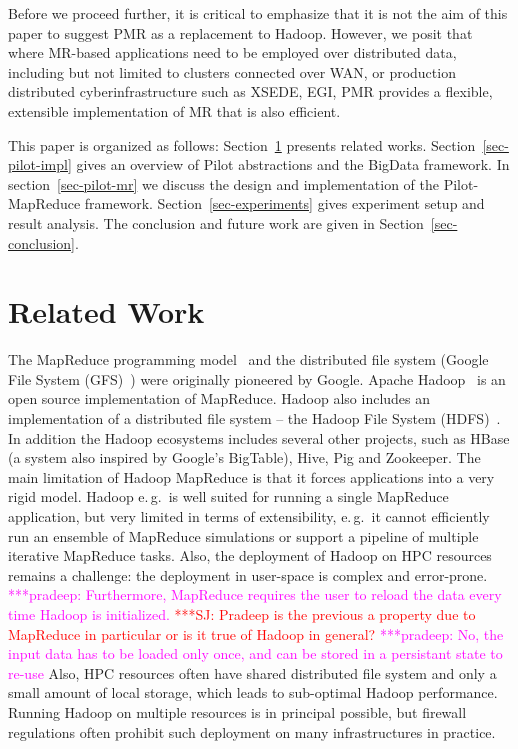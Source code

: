 \documentclass{sig-alternate}
\newcommand{\jhanote}[1]{ {\textcolor{red} { ***SJ: #1 }}}
\newcommand{\pnote}[1]{ {\textcolor{magenta} { ***pradeep: #1 }}}
\newcommand{\pnote}[1]{}
\newcommand{\jhanote}[1]{}
\newcommand{\upp}{\vspace*{-0.5em}}
\newcommand{\pilot}{Pilot\xspace}
\newcommand{\pilotmapreduce}{Pilot-MapReduce\xspace}
\begin{document}
Before we proceed further, it is critical to emphasize that it is not
the aim of this paper to suggest PMR as a replacement to Hadoop.
However, we posit that where MR-based applications need to be employed
over distributed data, including but not limited to clusters connected
over WAN, or production distributed cyberinfrastructure such as XSEDE,
EGI, PMR provides a flexible, extensible implementation of MR that is
also efficient.
 

This paper is organized as follows: Section~\ref{sec:related_work} presents
related works. Section~\ref{sec-pilot-impl} gives an overview of \pilot
abstractions and the BigData framework. In section~\ref{sec-pilot-mr} we discuss
the design and implementation of the \pilotmapreduce framework.
Section~\ref{sec-experiments} gives experiment setup and result analysis. The
conclusion and future work are given in Section~\ref{sec-conclusion}.

\upp\upp

\section{Related Work}
\label{sec:related_work}
The MapReduce programming model~\cite{Dean:2004:MSD:1251254.1251264}
and the distributed file system (Google File System
(GFS)~\cite{Ghemawat:2003:GFS:1165389.945450}) were originally
pioneered by Google. Apache Hadoop~\cite{hadoop} is an open source
implementation of MapReduce. Hadoop also includes an implementation of
a distributed file system -- the Hadoop File System
(HDFS)~\cite{Borthakur:2007fk}. In addition the Hadoop ecosystems
includes several other projects, such as HBase (a system also inspired
by Google's BigTable), Hive, Pig and Zookeeper. The main limitation of
Hadoop MapReduce is that it forces applications into a very rigid
model. Hadoop e.\,g.\ is well suited for running a single MapReduce
application, but very limited in terms of extensibility, e.\,g.\ it
cannot efficiently run an ensemble of MapReduce simulations or support
a pipeline of multiple iterative MapReduce tasks. Also, the deployment
of Hadoop on HPC resources remains a challenge: the deployment in
user-space is complex and error-prone.\pnote{Furthermore, MapReduce requires
the user to reload the data every time Hadoop is
initialized. }\jhanote{Pradeep is the previous a property due to
  MapReduce in particular or is it true of Hadoop in general?}\pnote{No, the input data 
has to be loaded only once, and can be stored in a persistant state to re-use} Also,
HPC resources often have shared distributed file system and only a
small amount of local storage, which leads to sub-optimal Hadoop
performance. Running Hadoop on multiple resources is in principal
possible, but firewall regulations often prohibit such deployment on
many infrastructures in practice.
\end{document}
